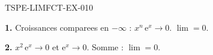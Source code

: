 \begin{corrige}{TSPE-LIMFCT-EX-010}

\textbf{1.} Croissances comparees en $-\infty$ : $x^n\,\mathrm{e}^x \to 0$. $\boxed{\lim = 0}$.

\textbf{2.} $x^2\,\mathrm{e}^x \to 0$ et $\mathrm{e}^x \to 0$. Somme : $\boxed{\lim = 0}$.

\end{corrige}
